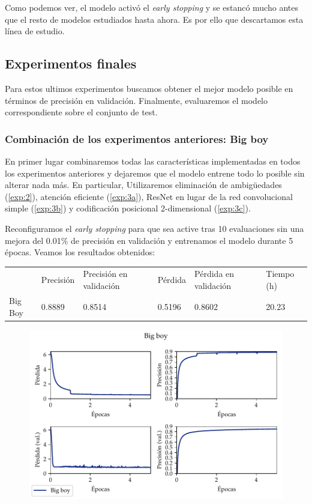 \documentclass[a4paper, 20pt, dvipsnames]{article}
\begin{document}
Como podemos ver, el modelo activó el \emph{early stopping} y se estancó mucho
antes que el resto de modelos estudiados hasta ahora. Es por ello que
descartamos esta línea de estudio.


\subsection{Experimentos finales}

Para estos ultimos experimentos buscamos obtener el mejor modelo posible en términos
de precisión en validación. Finalmente, evaluaremos el modelo correspondiente sobre el
conjunto de test.

\subsubsection{Combinación de los experimentos anteriores: Big boy}

En primer lugar combinaremos todas las características implementadas en todos los
experimentos anteriores y dejaremos que el modelo entrene todo lo posible sin alterar
nada más. En particular, Utilizaremos eliminación de ambigüedades (\ref{exp:2}),
atención eficiente (\ref{exp:3a}), ResNet en lugar de la red convolucional simple
(\ref{exp:3b}) y codificación posicional 2-dimensional (\ref{exp:3c}). 

Reconfiguramos el \emph{early stopping} para que sea active tras 10 evaluaciones
sin una mejora del 0.01\% de precisión en validación y entrenamos el modelo
durante 5 épocas. Veamos los resultados obtenidos:

\begin{table}[H]
	\centering
	\begin{tabular}{llllll}
		& Precisión & Precisión en validación & Pérdida & Pérdida en validación & Tiempo (h) \\ \cline{2-6} 
		Big Boy & 0.8889    & 0.8514                  & 0.5196  & 0.8602                & 20.23     
	\end{tabular}
\end{table}

\begin{figure}[H]
	\centering
	\includegraphics{fig/bigboy.pdf}
\end{figure}
\end{document}
